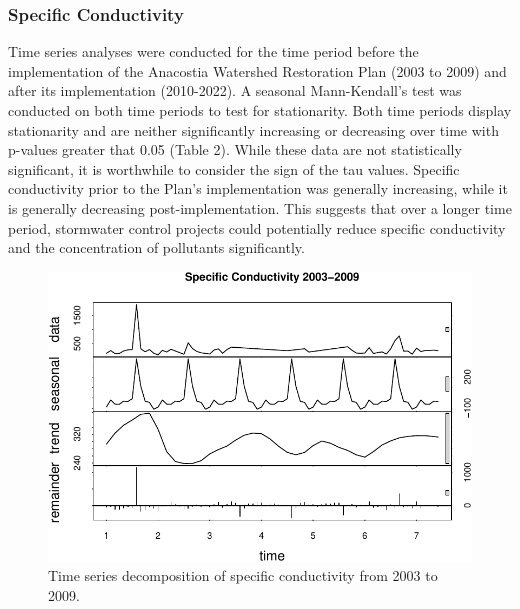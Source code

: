 \documentclass[
  12pt,
]{article}
\begin{document}
\newpage

\hypertarget{specific-conductivity}{%
\subsubsection{Specific Conductivity}\label{specific-conductivity}}

Time series analyses were conducted for the time period before the
implementation of the Anacostia Watershed Restoration Plan (2003 to
2009) and after its implementation (2010-2022). A seasonal
Mann-Kendall's test was conducted on both time periods to test for
stationarity. Both time periods display stationarity and are neither
significantly increasing or decreasing over time with p-values greater
that 0.05 (Table 2). While these data are not statistically significant,
it is worthwhile to consider the sign of the tau values. Specific
conductivity prior to the Plan's implementation was generally
increasing, while it is generally decreasing post-implementation. This
suggests that over a longer time period, stormwater control projects
could potentially reduce specific conductivity and the concentration of
pollutants significantly.

\begin{figure}

{\centering \includegraphics{Project_Template_files/figure-latex/Plot of Early Specific Conductivity Time Series Decomposition-1} 

}

\caption{Time series decomposition of specific conductivity from 2003 to 2009.}\label{fig:Plot of Early Specific Conductivity Time Series Decomposition}
\end{figure}
\end{document}
